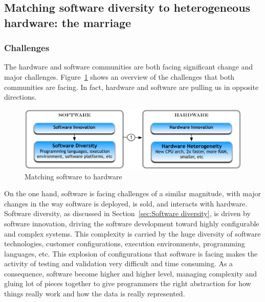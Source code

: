 


\subsection{Matching software diversity to heterogeneous hardware: the marriage}
\subsubsection{Challenges}
The hardware and software communities are both facing significant change and major challenges. Figure~\ref{fig:marriage} shows an overview of the challenges that both communities are facing. In fact, hardware and software are pulling us in opposite directions. 

\begin{figure}[h]
	\center
	\includegraphics[scale=0.65]{Background/fig/marriage}
	\caption{Matching software to hardware}
	\label{fig:marriage}
\end{figure}


On the one hand, software is facing challenges of a similar magnitude, with major changes in the way software is deployed, is sold, and interacts with hardware. 
Software diversity, as discussed in Section~\ref{sec:Software diversity}, is driven by software innovation, driving the software development toward highly configurable and complex systems. This complexity is carried by the huge diversity of software technologies, customer configurations, execution environments, programming languages, etc. This explosion of configurations that software is facing makes the activity of testing and validation very difficult and time consuming. 
As a consequence, software become higher and higher level, managing complexity and gluing lot of pieces together to give programmers the right abstraction for how things really work and how the data is really represented. 


